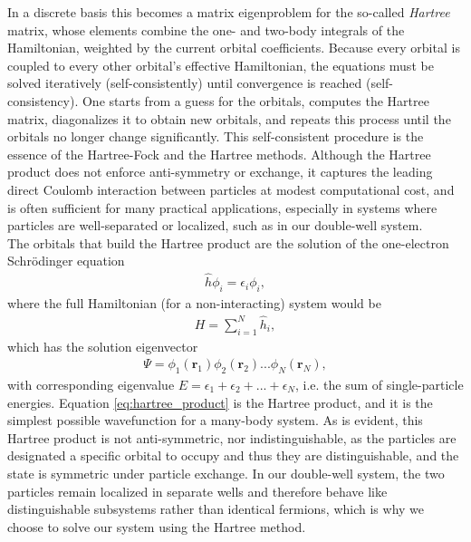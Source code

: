 \documentclass{subfiles}
\begin{document}
In a discrete basis this becomes a matrix eigenproblem for the so-called \emph{Hartree} matrix, whose elements combine the one- and two-body integrals of the Hamiltonian, weighted by the current orbital coefficients. Because every orbital is coupled to every other orbital's effective Hamiltonian, the equations must be solved iteratively (self-consistently) until convergence is reached (self-consistency). One starts from a guess for the orbitals, computes the Hartree matrix, diagonalizes it to obtain new orbitals, and repeats this process until the orbitals no longer change significantly. This self-consistent procedure is the essence of the Hartree-Fock and the Hartree methods. Although the Hartree product does not enforce anti-symmetry or exchange, it captures the leading direct Coulomb interaction between particles at modest computational cost, and is often sufficient for many practical applications, especially in systems where particles are well-separated or localized, such as in our double-well system.
\\
The orbitals that build the Hartree product are the solution of the one-electron Schrödinger equation 
\begin{align*}
    \hat{h}\phi_i = \epsilon_i\phi_i,
\end{align*}
where the full Hamiltonian (for a non-interacting) system would be 
\begin{align*}
    H = \sum_{i=1}^N \hat{h}_i,
\end{align*}
which has the solution eigenvector
\begin{align}
    \Psi = \phi_1(\mathbf{r}_1)\phi_2(\mathbf{r}_2)...\phi_N(\mathbf{r}_N)\label{eq:hartree_product},
\end{align}
with corresponding eigenvalue $E = \epsilon_1 + \epsilon_2 + ... + \epsilon_N$, i.e. the sum of single-particle energies. Equation \eqref{eq:hartree_product} is the Hartree product, and it is the simplest possible wavefunction for a many-body system. As is evident, this Hartree product is not anti-symmetric, nor indistinguishable, as the particles are designated a specific orbital to occupy and thus they are distinguishable, and the state is symmetric under particle exchange.
In our double-well system, the two particles remain localized in separate wells and therefore behave like distinguishable subsystems rather than identical fermions, which is why we choose to solve our system using the Hartree method.
\\ 
\end{document}
